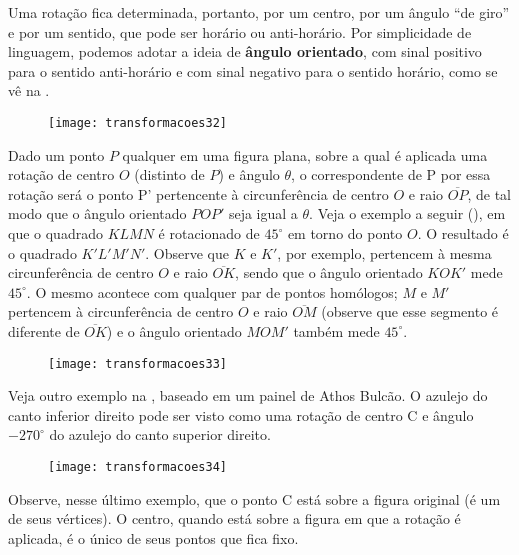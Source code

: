 Uma rotação fica determinada, portanto, por um centro, por um ângulo “de giro” e por um sentido, que pode ser horário ou anti-horário.  Por simplicidade de linguagem, podemos adotar a ideia de \textbf{ângulo orientado}, com sinal positivo para o sentido anti-horário e com sinal negativo para o sentido horário, como se vê na . 


\begin{figure}[H]
\centering

\texttt{[image: transformacoes32]}
\caption{}
\label{transformacoes32}
\end{figure}

Dado um ponto $P$ qualquer em uma figura plana, sobre a qual é aplicada uma rotação de centro $O$ (distinto de $P$) e ângulo $\theta$, o correspondente de P por essa rotação será o ponto P’ pertencente à circunferência de centro $O$ e raio $\overline{OP}$, de tal modo que o ângulo orientado $POP'$ seja igual a $\theta$. 
Veja o exemplo a seguir (), em que o quadrado $KLMN$ é rotacionado de $45^{\circ}$ em torno do ponto $O$. O resultado é o quadrado $K'L'M'N'$. Observe que $K$ e $K'$, por exemplo, pertencem à mesma circunferência de centro $O$ e raio $\overline{OK}$, sendo que o ângulo orientado $KOK'$ mede $45^{\circ}$. O mesmo acontece com qualquer par de pontos homólogos; $M$ e $M'$ pertencem à circunferência de centro $O$ e raio $\overline{OM}$ (observe que esse segmento é diferente de $\overline{OK}$) e o ângulo orientado $MOM'$ também mede $45^{\circ}$.

\begin{figure}[H]
\centering

\texttt{[image: transformacoes33]}
\caption{}
\label{transformacoes33}
\end{figure}


Veja outro exemplo na , baseado em um painel de Athos Bulcão. O azulejo do canto inferior direito pode ser visto como uma rotação de centro C e ângulo $-270^{\circ}$ do azulejo do canto superior direito.


\begin{figure}[H]
\centering

\texttt{[image: transformacoes34]}
\caption{}
\label{transformacoes34}
\end{figure}

Observe, nesse último exemplo, que o ponto C está sobre a figura original (é um de seus vértices). O centro, quando está sobre a figura em que a rotação é aplicada, é o único de seus pontos que fica fixo.

